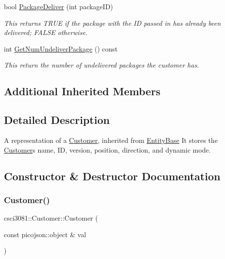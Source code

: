 \begin{DoxyCompactItemize}
bool \hyperlink{classcsci3081_1_1Customer_a0277fdbb1cdb28f8932f69ead7eadf9f}{Package\+Deliver} (int package\+ID)
\begin{DoxyCompactList}\small\item\em This returns T\+R\+UE if the package with the ID passed in has already been delivered; F\+A\+L\+SE otherwise. \end{DoxyCompactList}\item 
\mbox{\label{classcsci3081_1_1Customer_a82be2bf29df5167f5f6e15c510597bf7}} 
int \hyperlink{classcsci3081_1_1Customer_a82be2bf29df5167f5f6e15c510597bf7}{Get\+Num\+Undeliver\+Package} () const
\begin{DoxyCompactList}\small\item\em This return the number of undelivered packages the customer has. \end{DoxyCompactList}\end{DoxyCompactItemize}
\subsection*{Additional Inherited Members}


\subsection{Detailed Description}
A representation of a \hyperlink{classcsci3081_1_1Customer}{Customer}, inherited from \hyperlink{classcsci3081_1_1EntityBase}{Entity\+Base} It stores the \hyperlink{classcsci3081_1_1Customer}{Customer}\textquotesingle{}s name, ID, version, position, direction, and dynamic mode. 

\subsection{Constructor \& Destructor Documentation}
\mbox{\label{classcsci3081_1_1Customer_abbbf2b0f11d653b3cb0c2926064a830a}} 
\subsubsection{\texorpdfstring{Customer()}{Customer()}\hspace{0.1cm}{\footnotesize\ttfamily [1/2]}}
{\footnotesize\ttfamily csci3081\+::\+Customer\+::\+Customer (\begin{DoxyParamCaption}\item[{const picojson\+::object \&}]{val }\end{DoxyParamCaption})}

